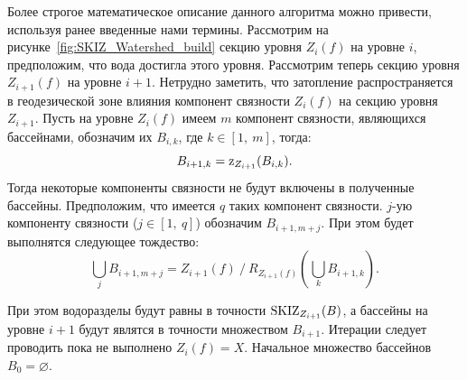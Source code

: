 \documentclass[14pt, a4paper]{extreport}
\begin{document}
	Более строгое математическое описание данного алгоритма можно привести, используя ранее введенные нами термины. Рассмотрим на рисунке~\ref{fig:SKIZ_Watershed_build} секцию уровня $Z_i(f)$ на уровне $i$, предположим, что вода достигла этого уровня. Рассмотрим теперь секцию уровня $Z_{i + 1}(f)$ на уровне $i + 1$. Нетрудно заметить, что затопление распространяется в геодезической зоне влияния компонент связности $Z_i(f)$ на секцию уровня $Z_{i+1}$. Пусть на уровне $Z_i(f)$ имеем $m$ компонент связности, являющихся бассейнами, обозначим их $B_{i,k}$, где $k \in [1,~m]$, тогда:\vspace*{-0.3cm}
	\begin{equation*}
		B_{i+1,k} = \textup{z}_{Z_{i + 1}}(B_{i,k}).
		\vspace*{-0.3cm}
		\label{IZ_X(Y)}
	\end{equation*}
	Тогда некоторые компоненты связности не будут включены в полученные бассейны. Предположим, что имеется $q$ таких компонент связности. $j$-ую компоненту связности ($j \in [1,~q]$) обозначим $B_{i+1,m+j}$. При этом будет выполнятся следующее тождество:
	\begin{equation*}
		\bigcup_{j} B_{i+1,m+j} = Z_{i+1}(f)~/~R_{Z_{i + 1}(f)}\left(\bigcup_{k} B_{i+1,k}\right).
		\label{IZ_X(Y)}
	\end{equation*}
	
	При этом водоразделы будут равны в точности $\textup{SKIZ}_{Z_{i+1}}(B)$, а бассейны на уровне $i+1$ будут являтся в точности множеством $B_{i+1}$. Итерации следует проводить пока не выполнено $Z_i(f) = X$. Начальное множество бассейнов $B_0 = \varnothing$.
	
\end{document}
